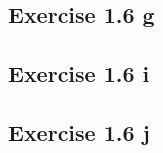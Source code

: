 \documentclass{article}
\begin{document}
\subsection{Exercise 1.6 g}

\subsection{Exercise 1.6 i}

\subsection{Exercise 1.6 j}

\section{}

\section{}
\end{document}
